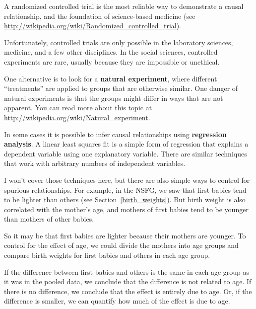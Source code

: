 \documentclass[12pt]{book}
\begin{document}
A randomized controlled trial is the most reliable way to demonstrate
a causal relationship, and the foundation of science-based medicine
(see \url{http://wikipedia.org/wiki/Randomized_controlled_trial}).

Unfortunately, controlled trials are only possible in the laboratory
sciences, medicine, and a few other disciplines.  In the social sciences,
controlled experiments are rare, usually because they are impossible
or unethical.

One alternative is to look for a {\bf natural experiment}, where
different ``treatments'' are applied to groups that are otherwise
similar.  One danger of natural experiments is that the groups might
differ in ways that are not apparent.  You can read more about this
topic at \url{http://wikipedia.org/wiki/Natural_experiment}.

In some cases it is possible to infer causal relationships using {\bf
  regression analysis}.  A linear least squares fit
is a simple form of regression that explains a dependent
variable using one explanatory variable.  There are similar
techniques that work with arbitrary numbers of independent variables.

I won't cover those techniques here, but there are also simple ways to
control for spurious relationships.  For example, in the NSFG, we saw
that first babies tend to be lighter than others (see
Section~\ref{birth_weights}).  But birth weight is also correlated
with the mother's age, and mothers of first babies tend to be younger
than mothers of other babies.

So it may be that first babies are lighter because their mothers are
younger.  To control for the effect of age, we could divide the mothers
into age groups and compare birth weights for first babies and others
in each age group.

If the difference between first babies and others is the same in
each age group as it was in the pooled data, we conclude
that the difference is not related to age.  If there is no difference,
we conclude that the effect is entirely due to age.  Or,
if the difference is smaller, we can quantify how much of the effect
is due to age.
\end{document}
